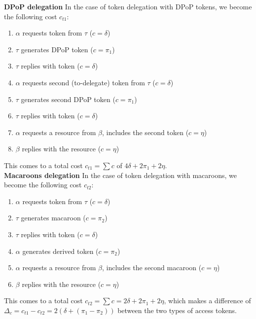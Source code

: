 \noindent\textbf{DPoP delegation} In the case of token delegation with \gls{DPoP} tokens, we become the following cost $c_{t1}$:
\begin{enumerate}
    \item $\alpha$ requests token from $\tau$ ($c = \delta$)
    \item $\tau$ generates \gls{DPoP} token ($c = \pi_1$)
    \item $\tau$ replies with token ($c = \delta$)
    \item $\alpha$ requests second (to-delegate) token from $\tau$ ($c = \delta$)
    \item $\tau$ generates second \gls{DPoP} token ($c = \pi_1$)
    \item $\tau$ replies with token ($c = \delta$)
    \item $\alpha$ requests a resource from $\beta$, includes the second token ($c = \eta$)
    \item $\beta$ replies with the resource ($c = \eta$)
\end{enumerate}
\noindent This comes to a total cost $c_{t1} = \sum c$ of $4\delta + 2\pi_1 + 2\eta$.\\

\noindent\textbf{Macaroons delegation} In the case of token delegation with macaroons, we become the following cost $c_{t2}$:
\begin{enumerate}
    \item $\alpha$ requests token from $\tau$ ($c = \delta$)
    \item $\tau$ generates macaroon ($c = \pi_2$)
    \item $\tau$ replies with token ($c = \delta$)
    \item $\alpha$ generates derived token ($c = \pi_2$)
    \item $\alpha$ requests a resource from $\beta$, includes the second macaroon ($c = \eta$)
    \item $\beta$ replies with the resource ($c = \eta$)
\end{enumerate}
\noindent This comes to a total cost $c_{t2} = \sum c = 2\delta + 2\pi_1 + 2\eta$, which makes a difference of $\Delta_c = c_{t1} - c_{t2} = 2(\delta + (\pi_1 - \pi_2))$ between the two types of access tokens.

